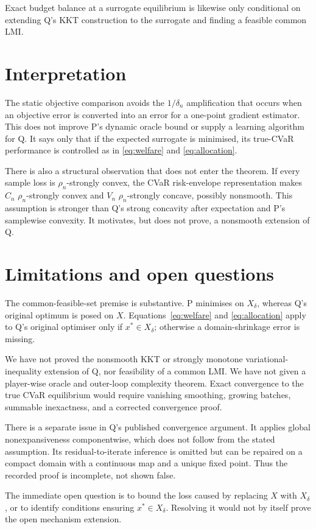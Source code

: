 \documentclass{article}
\begin{document}
Exact budget balance at a surrogate equilibrium is likewise only conditional on extending Q's KKT construction to the surrogate and finding a feasible common LMI.  %

\section{Interpretation}

The static objective comparison avoids the $1/\delta_n$ amplification that occurs when an objective error is converted into an error for a one-point gradient estimator.  %
This does not improve P's dynamic oracle bound or supply a learning algorithm for Q.  It says only that if the expected surrogate is minimised, its true-CVaR performance is controlled as in \eqref{eq:welfare} and \eqref{eq:allocation}.  %

There is also a structural observation that does not enter the theorem.  If every sample loss is $\rho_n$-strongly convex, the CVaR risk-envelope representation makes $C_n$ $\rho_n$-strongly convex and $V_n$ $\rho_n$-strongly concave, possibly nonsmooth.  %
This assumption is stronger than Q's strong concavity after expectation and P's samplewise convexity.  %
It motivates, but does not prove, a nonsmooth extension of Q.  %

\section{Limitations and open questions}

The common-feasible-set premise is substantive.  P minimises on $X_\delta$, whereas Q's original optimum is posed on $X$.  Equations~\eqref{eq:welfare} and \eqref{eq:allocation} apply to Q's original optimiser only if $x^*\in X_\delta$; otherwise a domain-shrinkage error is missing.  %

We have not proved the nonsmooth KKT or strongly monotone variational-inequality extension of Q, nor feasibility of a common LMI.  %
We have not given a player-wise oracle and outer-loop complexity theorem.  %
Exact convergence to the true CVaR equilibrium would require vanishing smoothing, growing batches, summable inexactness, and a corrected convergence proof.  %

There is a separate issue in Q's published convergence argument.  It applies global nonexpansiveness componentwise, which does not follow from the stated assumption.  %
Its residual-to-iterate inference is omitted but can be repaired on a compact domain with a continuous map and a unique fixed point.  Thus the recorded proof is incomplete, not shown false.  %

The immediate open question is to bound the loss caused by replacing $X$ with $X_\delta$, or to identify conditions ensuring $x^*\in X_\delta$.  %
Resolving it would not by itself prove the open mechanism extension.  %



\end{document}
